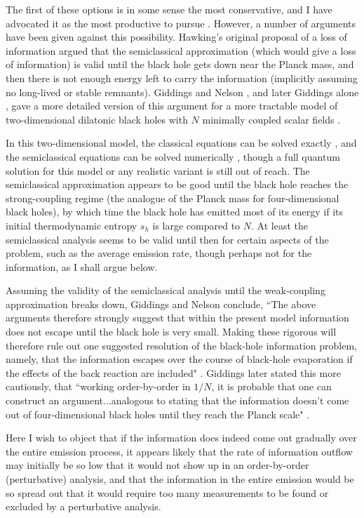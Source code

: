	The first of these options is in some sense the most
conservative,
and I have advocated it as the most productive to pursue
\cite{Pag80}.
However, a number of arguments have been given against this
possibility.  Hawking's original proposal of a loss of information
\cite{Haw76} argued that the semiclassical approximation (which
would give a loss of information) is valid until the black hole gets
down near the Planck mass, and then there is not enough energy left
to carry the information (implicitly assuming no long-lived or stable
remnants).  Giddings and Nelson \cite{GidNel}, and later Giddings
alone \cite{Gid92}, gave a more detailed version of this argument
for a more tractable model of two-dimensional dilatonic black holes
with $N$ minimally coupled scalar fields \cite{CGHS}.

	In this two-dimensional model, the classical equations can be
solved exactly \cite{CGHS}, and the semiclassical equations can be
solved numerically \cite {Pir93}, though a full quantum solution for
this model or any realistic variant is still out of reach.  The
semiclassical
approximation appears to be good until the black hole reaches the
strong-coupling regime (the analogue of the Planck mass for
four-dimensional black holes), by which time the black hole has
emitted most of its energy if its initial thermodynamic entropy
$s_h$ is large compared to $N$.  At least the semiclassical
analysis seems to be valid until then for certain aspects
of the problem, such as the average emission rate,
though perhaps not for the information, as I shall argue below.

	Assuming the validity of the semiclassical analysis until the
weak-coupling approximation breaks down, Giddings and Nelson
\cite{GidNel} conclude, ``The above arguments therefore strongly
suggest that within the present model information does not escape
until the black hole is very small.  Making these rigorous will
therefore
rule out one suggested resolution of the black-hole information
problem, namely, that the information escapes over the course of
black-hole evaporation if the effects of the back reaction are
included"
\cite{GidNel}.  Giddings later stated this more cautiously, that
``working order-by-order in $1/N$, it is probable that
one can construct an argument...analogous to stating that the
information
doesn't come out of four-dimensional black holes until they reach the
Planck
scale" \cite{Gid92}.

	Here I wish to object that if the information does indeed
come out
gradually over the entire emission process, it appears likely that
the rate
of information outflow may initially be so low that it would not show
up
in an order-by-order (perturbative) analysis, and that the
information
in the entire emission would be so spread out that it would require
too
many measurements to be found or excluded by a perturbative analysis.

